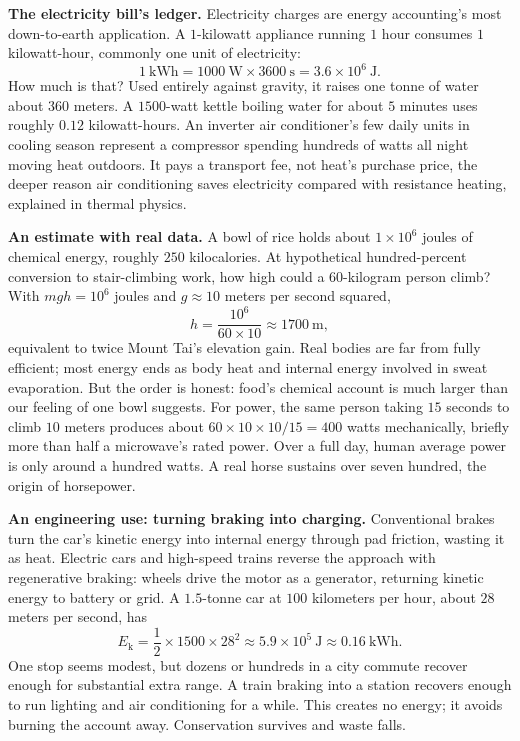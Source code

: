 \textbf{The electricity bill's ledger.} Electricity charges are energy accounting's most down-to-earth application. A \(1\)-kilowatt appliance running \(1\) hour consumes \(1\) kilowatt-hour, commonly one unit of electricity:
\[
1\ \text{kWh}=1000\ \text{W}\times3600\ \text{s}=3.6\times10^{6}\ \text{J} .
\]
How much is that? Used entirely against gravity, it raises one tonne of water about \(360\) meters. A \(1500\)-watt kettle boiling water for about \(5\) minutes uses roughly \(0.12\) kilowatt-hours. An inverter air conditioner's few daily units in cooling season represent a compressor spending hundreds of watts all night moving heat outdoors. It pays a transport fee, not heat's purchase price, the deeper reason air conditioning saves electricity compared with resistance heating, explained in thermal physics.

\textbf{An estimate with real data.} A bowl of rice holds about \(1\times10^{6}\) joules of chemical energy, roughly \(250\) kilocalories. At hypothetical hundred-percent conversion to stair-climbing work, how high could a \(60\)-kilogram person climb? With \(mgh=10^{6}\) joules and \(g\approx10\) meters per second squared,
\[
h=\frac{10^{6}}{60\times10}\approx 1700\ \text{m} ,
\]
equivalent to twice Mount Tai's elevation gain. Real bodies are far from fully efficient; most energy ends as body heat and internal energy involved in sweat evaporation. But the order is honest: food's chemical account is much larger than our feeling of one bowl suggests. For power, the same person taking \(15\) seconds to climb \(10\) meters produces about \(60\times10\times10/15=400\) watts mechanically, briefly more than half a microwave's rated power. Over a full day, human average power is only around a hundred watts. A real horse sustains over seven hundred, the origin of horsepower.

\textbf{An engineering use: turning braking into charging.} Conventional brakes turn the car's kinetic energy into internal energy through pad friction, wasting it as heat. Electric cars and high-speed trains reverse the approach with regenerative braking: wheels drive the motor as a generator, returning kinetic energy to battery or grid. A \(1.5\)-tonne car at \(100\) kilometers per hour, about \(28\) meters per second, has
\[
E_{\mathrm k}=\frac12\times1500\times28^{2}\approx 5.9\times10^{5}\ \text{J}\approx 0.16\ \text{kWh} .
\]
One stop seems modest, but dozens or hundreds in a city commute recover enough for substantial extra range. A train braking into a station recovers enough to run lighting and air conditioning for a while. This creates no energy; it avoids burning the account away. Conservation survives and waste falls.

